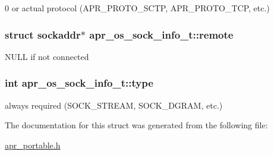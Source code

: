 0 or actual protocol (A\-P\-R\-\_\-\-P\-R\-O\-T\-O\-\_\-\-S\-C\-T\-P, A\-P\-R\-\_\-\-P\-R\-O\-T\-O\-\_\-\-T\-C\-P, etc.) \hypertarget{structapr__os__sock__info__t_ae71fe14a5eb9141fc4ad0a6d0a91f17e}{
\subsubsection[{remote}]{\setlength{\rightskip}{0pt plus 5cm}struct sockaddr$\ast$ apr\-\_\-os\-\_\-sock\-\_\-info\-\_\-t\-::remote}}\label{structapr__os__sock__info__t_ae71fe14a5eb9141fc4ad0a6d0a91f17e}
N\-U\-L\-L if not connected \hypertarget{structapr__os__sock__info__t_a248fb394cd644b31619f44de0936aa04}{
\subsubsection[{type}]{\setlength{\rightskip}{0pt plus 5cm}int apr\-\_\-os\-\_\-sock\-\_\-info\-\_\-t\-::type}}\label{structapr__os__sock__info__t_a248fb394cd644b31619f44de0936aa04}
always required (S\-O\-C\-K\-\_\-\-S\-T\-R\-E\-A\-M, S\-O\-C\-K\-\_\-\-D\-G\-R\-A\-M, etc.) 

The documentation for this struct was generated from the following file\-:\begin{DoxyCompactItemize}
\item 
\hyperlink{apr__portable_8h}{apr\-\_\-portable.\-h}\end{DoxyCompactItemize}
